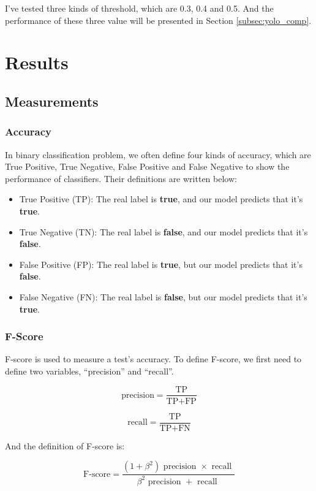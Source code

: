 \documentclass{article}[12pt, twocolumn]
\begin{document}
I've tested three kinds of threshold, which are 0.3, 0.4 and 0.5. And the performance of these
three value will be presented in Section \ref{subsec:yolo_comp}.

\section{Results} \label{sec:res}
\subsection{Measurements}
\subsubsection{Accuracy}
In binary classification problem, we often define four kinds of accuracy, 
which are True Positive, True Negative, False Positive and False Negative 
to show the performance of classifiers. Their definitions are written below:
\begin{itemize}
    \item True Positive (TP): The real label is \textbf{true}, 
    and our model predicts that it's \textbf{true}.
    \item True Negative (TN): The real label is \textbf{false}, 
    and our model predicts that it's \textbf{false}.
    \item False Positive (FP): The real label is \textbf{true}, 
    but our model predicts that it's \textbf{false}.
    \item False Negative (FN): The real label is \textbf{false}, 
    but our model predicts that it's \textbf{true}.
\end{itemize}
\subsubsection{F-Score}
F-score is used to measure a test's accuracy. 
To define F-score, we first need to define two variables, 
``precision'' and ``recall''.

\begin{equation}
    \text {precision}=\frac{\text{TP}}{\text{TP}+\text{FP}}
\end{equation}

\begin{equation}
    \text {recall}=\frac{\text{TP}}{\text{TP}+\text{FN}}
\end{equation}

And the definition of F-score is:

\begin{equation}
    \text {F-score}=\frac{\left(1+\beta^{2}\right) \text { precision } \times \text { recall }}{\beta^{2} \text { precision }+\text { recall }}
\end{equation}
\end{document}
